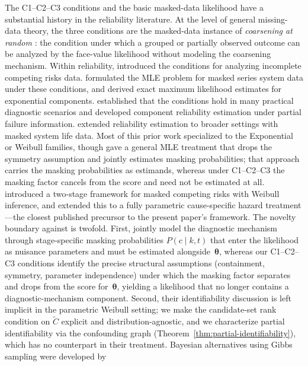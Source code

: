 \documentclass[11pt]{article}
\theoremstyle{definition}
\theoremstyle{plain}
\renewcommand{\v}[1]{\boldsymbol{#1}}
\begin{document}
The C1--C2--C3 conditions and the basic masked-data likelihood have a
substantial history in the reliability literature.
At the level of general missing-data theory, the three conditions are
the masked-data instance of \emph{coarsening at random}
\citep{heitjan1991,gill1997coarsening}: the condition under which a
grouped or partially observed outcome can be analyzed by the face-value
likelihood without modeling the coarsening mechanism.
Within reliability, \citet{miyakawa1984} introduced the conditions for
analyzing incomplete competing risks data.
\citet{Usher-1988} formulated the MLE problem for masked series system
data under these conditions, and \citet{Lin-1993} derived exact maximum
likelihood estimates for exponential components.
\citet{guess1991} established that the conditions hold in many practical
diagnostic scenarios and developed component reliability estimation under
partial failure information.
\citet{sarhan2001} extended reliability estimation to broader settings
with masked system life data.
Most of this prior work specialized to the Exponential or Weibull
families, though \citet{mukhopadhyay2006} gave a general MLE treatment
that drops the symmetry assumption and jointly estimates masking
probabilities; that approach carries the masking probabilities as
estimands, whereas under C1--C2--C3 the masking factor cancels from the
score and need not be estimated at all.
\citet{flehinger1998} introduced a two-stage framework for masked
competing risks with Weibull inference, and \citet{flehinger2002}
extended this to a fully parametric cause-specific hazard treatment---the
closest published precursor to the present paper's framework.
The novelty boundary against \citet{flehinger2002} is twofold.
First, \citet{flehinger2002} jointly model the diagnostic mechanism
through stage-specific masking probabilities $P(c \mid k, t)$ that
enter the likelihood as nuisance parameters and must be estimated
alongside~$\v{\theta}$, whereas our C1--C2--C3 conditions identify the
precise structural assumptions (containment, symmetry, parameter
independence) under which the masking factor separates and drops from
the score for~$\v{\theta}$, yielding a likelihood that no longer
contains a diagnostic-mechanism component.
Second, their identifiability discussion is left implicit in the
parametric Weibull setting; we make the candidate-set rank condition
on $\tilde C$ explicit and distribution-agnostic, and we characterize
partial identifiability via the confounding graph
(Theorem~\ref{thm:partial-identifiability}), which has no counterpart
in their treatment.
Bayesian alternatives using Gibbs sampling were developed by
\end{document}
